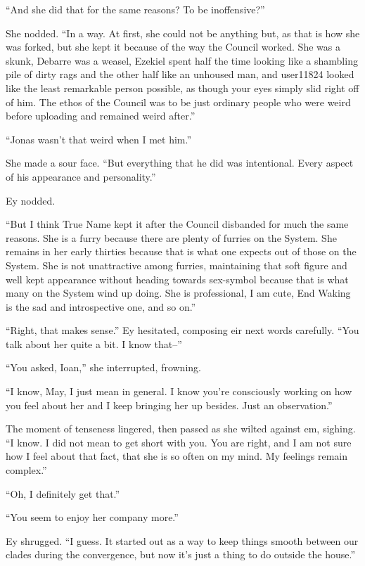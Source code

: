 ``And she did that for the same reasons? To be inoffensive?''

She nodded. ``In a way. At first, she could not be anything but, as that is how she was forked, but she kept it because of the way the Council worked. She was a skunk, Debarre was a weasel, Ezekiel spent half the time looking like a shambling pile of dirty rags and the other half like an unhoused man, and user11824 looked like the least remarkable person possible, as though your eyes simply slid right off of him. The ethos of the Council was to be just ordinary people who were weird before uploading and remained weird after.''

``Jonas wasn't that weird when I met him.''

She made a sour face. ``But everything that he did was intentional. Every aspect of his appearance and personality.''

Ey nodded.

``But I think True Name kept it after the Council disbanded for much the same reasons. She is a furry because there are plenty of furries on the System. She remains in her early thirties because that is what one expects out of those on the System. She is not unattractive among furries, maintaining that soft figure and well kept appearance without heading towards sex-symbol because that is what many on the System wind up doing. She is professional, I am cute, End Waking is the sad and introspective one, and so on.''

``Right, that makes sense.'' Ey hesitated, composing eir next words carefully. ``You talk about her quite a bit. I know that--''

``You asked, Ioan,'' she interrupted, frowning.

``I know, May, I just mean in general. I know you're consciously working on how you feel about her and I keep bringing her up besides. Just an observation.''

The moment of tenseness lingered, then passed as she wilted against em, sighing. ``I know. I did not mean to get short with you. You are right, and I am not sure how I feel about that fact, that she is so often on my mind. My feelings remain complex.''

``Oh, I definitely get that.''

``You seem to enjoy her company more.''

Ey shrugged. ``I guess. It started out as a way to keep things smooth between our clades during the convergence, but now it's just a thing to do outside the house.''

